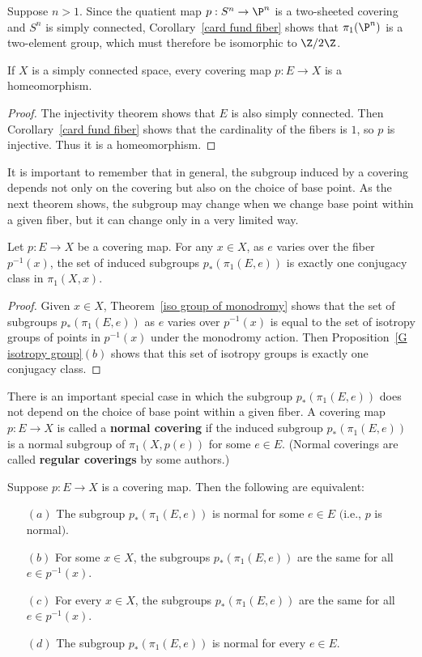 \begin{example}
Suppose $n>1$. Since the quatient map $p:S^n\to\P^n$ is a two-sheeted covering and $S^n$ is simply connected, Corollary~\ref{card fund fiber} shows that $\pi_1(\P^n)$ is a two-element group, which must therefore be isomorphic to $\Z/2\Z$.
\end{example}
\begin{corollary}
If $X$ is a simply connected space, every covering map $p:E\to X$ is a homeomorphism.
\end{corollary}
\begin{proof}
The injectivity theorem shows that $E$ is also simply connected. Then Corollary~\ref{card fund fiber} shows that the cardinality of the fibers is $1$, so $p$ is injective. Thus it is a homeomorphism.
\end{proof}
It is important to remember that in general, the subgroup induced by a covering depends not only on the covering but also on the choice of base point. As the next theorem shows, the subgroup may change when we change base point within a given fiber, but it can change only in a very limited way.
\begin{theorem}
Let $p:E\to X$ be a covering map. For any $x\in X$, as $e$ varies over the fiber $p^{-1}(x)$, the set of induced subgroups $p_*(\pi_1(E,e))$ is exactly one conjugacy class in $\pi_1(X,x)$.
\end{theorem}
\begin{proof}
Given $x\in X$, Theorem~\ref{iso group of monodromy} shows that the set of subgroups $p_*(\pi_1(E,e))$ as $e$ varies over $p^{-1}(x)$ is equal to the set of isotropy groups of points in $p^{-1}(x)$ under the monodromy action. Then Proposition~\ref{G isotropy group}$(b)$ shows that this set of isotropy groups is exactly one conjugacy class.
\end{proof}
There is an important special case in which the subgroup $p_*(\pi_1(E,e))$ does not depend on the choice of base point within a given fiber. A covering map $p:E\to X$ is
called a \textbf{normal covering} if the induced subgroup $p_*(\pi_1(E,e))$ is a normal subgroup of $\pi_1(X,p(e))$ for some $e\in E$. (Normal coverings are called \textbf{regular coverings} by some authors.)
\begin{proposition}\label{char nomral cover}
Suppose $p:E\to X$ is a covering map. Then the following are equivalent:
\begin{itemize}
\item[$(a)$] The subgroup $p_*(\pi_1(E,e))$ is normal for some $e\in E$ $($i.e., $p$ is normal$)$.
\item[$(b)$] For some $x\in X$, the subgroups $p_*(\pi_1(E,e))$ are the same for all $e\in p^{-1}(x)$.
\item[$(c)$] For every $x\in X$, the subgroups $p_*(\pi_1(E,e))$ are the same for all $e\in p^{-1}(x)$.
\item[$(d)$] The subgroup $p_*(\pi_1(E,e))$ is normal for every $e\in E$.
\end{itemize}
\end{proposition}
